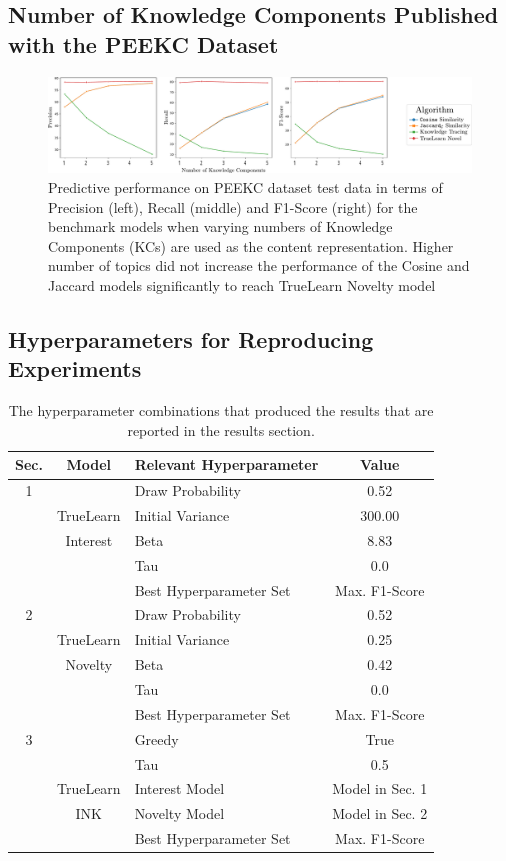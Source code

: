 \documentclass[letterpaper]{article} %
\begin{document}
\newpage
\subsection{Number of Knowledge Components Published with the PEEKC Dataset}

\begin{figure}[h]
\begin{center}
    \centerline{\includegraphics[width=1.1\linewidth]{results_plot.pdf}}
    \caption{Predictive performance on PEEKC dataset test data in terms of Precision (left), Recall (middle) and F1-Score (right) for the benchmark models when varying numbers of Knowledge Components (KCs) are used as the content representation. Higher number of topics did not increase the performance of the Cosine and Jaccard models significantly to reach TrueLearn Novelty model}
\end{center}
\end{figure}

\subsection{Hyperparameters for Reproducing Experiments}

\begin{table}[h] \footnotesize
\caption{The hyperparameter combinations that produced the results that are reported in the results section.} 
\centering 
\begin{tabular}{c c l c}
  \hline
    Sec. &  Model & Relevant Hyperparameter & Value \\
  \hline
  1 & & Draw Probability & 0.52\\
  & TrueLearn& Initial Variance & 300.00 \\
  & Interest& Beta & 8.83 \\
  & & Tau & 0.0\\
  & & Best Hyperparameter Set & Max. F1-Score \\
  \hline
 2 & & Draw Probability & 0.52\\
  & TrueLearn& Initial Variance & 0.25 \\
  & Novelty& Beta & 0.42 \\
  & & Tau & 0.0\\
  & & Best Hyperparameter Set & Max. F1-Score \\
  \hline
  3 & & Greedy & True\\
  & & Tau & 0.5\\
  & TrueLearn & Interest Model & Model in Sec. 1 \\
  & INK & Novelty Model & Model in Sec. 2 \\
  & & Best Hyperparameter Set & Max. F1-Score \\
   \hline
\end{tabular}
\end{table}
\end{document}
